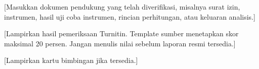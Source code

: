 \clearpage
\appendix


[Masukkan dokumen pendukung yang telah diverifikasi, misalnya surat izin,
instrumen, hasil uji coba instrumen, rincian perhitungan, atau keluaran analisis.]

\ifproposal\else

  [Lampirkan hasil pemeriksaan Turnitin. Template sumber menetapkan skor maksimal
  20 persen. Jangan menulis nilai sebelum laporan resmi tersedia.]


  [Lampirkan kartu bimbingan jika tersedia.]
\fi
